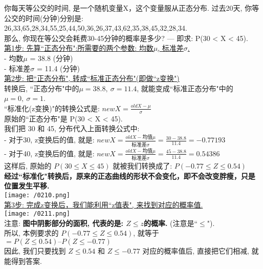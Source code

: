\documentclass[UTF8]{ctexart}
\begin{document}
\begin{myEnvSample}
	你每天等公交的时间, 是一个随机变量X，这个变量服从正态分布. 过去20天, 你等公交的时间(分钟)分别是: 26,33,65,28,34,55,25,44,50,36,26,37,43,62,35,38,45,32,28,34. \\
	那么, 你现在等公交会耗费30-45分钟的概率是多少? --- 即求:  P(30 < X < 45). \\
	
	
	\underline{第1步: 先算``正态分布":所需要的两个参数: 均数$\mu$, 标准差$\sigma$.} \\
	- 均数$\mu$ = 38.8 (分钟) \\
	- 标准差$\sigma$ = 11.4 (分钟) \\


	\underline{第2步: 把``正态分布", 转成``标准正态分布"(即做``z变换")} \\
	转换后,  ``正态分布"中的$\mu=38.8, \ \sigma=11.4$, 就能变成``标准正态分布"中的$\mu=0, \ \sigma=1$. \\
	
	``标准化(z变换)"的转换公式是: $\boxed{
		new X= \frac{oldX- \mu} {\sigma} 
	}$ \\
	原始的``正态分布"是 P(30 < X < 45). \\
	我们把 30 和 45, 分布代入上面转换公式中: \\
	- 对于30, z变换后的值, 就是: $newX=\frac{oldX-\text{均值}\mu}{\text{标准差}\sigma}=\frac{30-38.8}{11.4}=-0.77193	$ \\
	- 对于40, z变换后的值, 就是: $newX=\frac{oldX-\text{均值}\mu}{\text{标准差}\sigma}=\frac{45-38.8}{11.4}=0.54386	$ \\
	
	这样后, 原始的 $P(30 \leq X \leq 45)$ 就被我们转换成了:  $P(-0.77 \leq Z \leq 0.54)$ \\
	
	\textbf{经过``标准化"转换后，原来的正态曲线的形状不会变化，即不会改变胖瘦，只是位置发生平移.} \\
	\texttt{[image: /0210.png]} \\ 


	\underline{第3步: 完成z变换后，我们能利用``z值表", 来找到对应的概率值.} \\
	
	\texttt{[image: /0211.png]} \\	
	注意: \textbf{图中阴影部分的面积, 代表的是: $Z \leq z$的概率.} (注意是``$\leq$"). \\	
	
	所以, 本例要求的 $P(-0.77 \leq Z \leq 0.54)$, 就等于 $= P(Z \leq 0.54) – P(Z \leq -0.77)$ \\
	因此, 我们只要找到 $Z \leq 0.54$ 和 $Z \leq -0.77$ 对应的概率值后, 直接把它们相减, 就能得到答案. \\
	

\end{myEnvSample}
\end{document}
